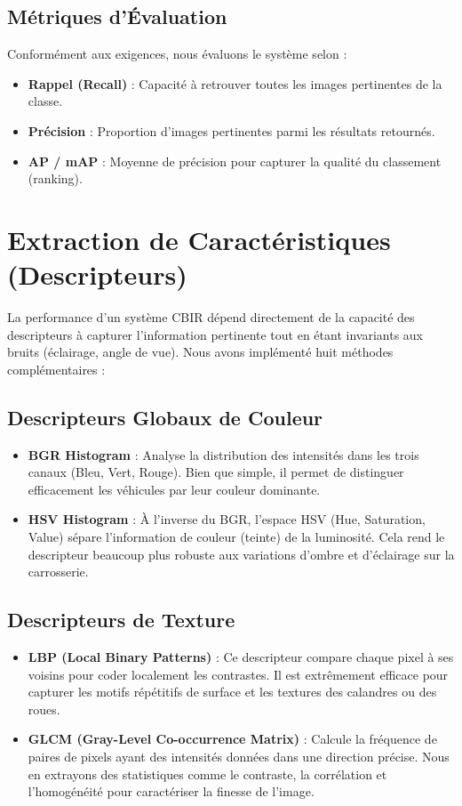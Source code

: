 \documentclass[a4paper,12pt]{report}%
\begin{document}
\section{Métriques d'Évaluation}
Conformément aux exigences, nous évaluons le système selon :
\begin{itemize}
    \item \textbf{Rappel (Recall)} : Capacité à retrouver toutes les images pertinentes de la classe.
    \item \textbf{Précision} : Proportion d'images pertinentes parmi les résultats retournés.
    \item \textbf{AP / mAP} : Moyenne de précision pour capturer la qualité du classement (ranking).
\end{itemize}

\chapter{Extraction de Caractéristiques (Descripteurs)}
La performance d'un système CBIR dépend directement de la capacité des descripteurs à capturer l'information pertinente tout en étant invariants aux bruits (éclairage, angle de vue). Nous avons implémenté huit méthodes complémentaires :

\section{Descripteurs Globaux de Couleur}
\begin{itemize}
    \item \textbf{BGR Histogram} : Analyse la distribution des intensités dans les trois canaux (Bleu, Vert, Rouge). Bien que simple, il permet de distinguer efficacement les véhicules par leur couleur dominante.
    \item \textbf{HSV Histogram} : À l'inverse du BGR, l'espace HSV (Hue, Saturation, Value) sépare l'information de couleur (teinte) de la luminosité. Cela rend le descripteur beaucoup plus robuste aux variations d'ombre et d'éclairage sur la carrosserie.
\end{itemize}

\section{Descripteurs de Texture}
\begin{itemize}
    \item \textbf{LBP (Local Binary Patterns)} : Ce descripteur compare chaque pixel à ses voisins pour coder localement les contrastes. Il est extrêmement efficace pour capturer les motifs répétitifs de surface et les textures des calandres ou des roues.
    \item \textbf{GLCM (Gray-Level Co-occurrence Matrix)} : Calcule la fréquence de paires de pixels ayant des intensités données dans une direction précise. Nous en extrayons des statistiques comme le contraste, la corrélation et l'homogénéité pour caractériser la finesse de l'image.
\end{itemize}
\end{document}
